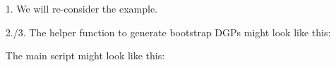 \begin{enumerate}

\item[1.] We will re-consider the \textcite{Rubio-Ramirez.Waggoner.Zha_2010_StructuralVectorAutoregressions} example.

\item[2./3.]  The helper function to generate bootstrap DGPs might look like this:

The main script might look like this:


\end{enumerate}